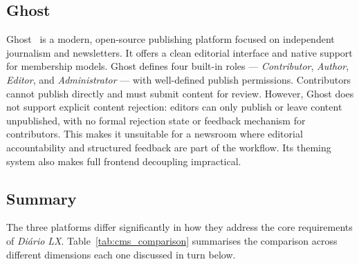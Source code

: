 \subsection{Ghost} \label{sec:background_ghost}

Ghost~\cite{ghost_cms} is a modern, open-source publishing platform focused on independent journalism
and newsletters. It offers a clean editorial interface and native support for
membership models. Ghost defines four built-in roles --- \textit{Contributor},
\textit{Author}, \textit{Editor}, and \textit{Administrator} --- with well-defined
publish permissions. Contributors cannot publish directly and must submit content for
review. However, Ghost does not support explicit content rejection: editors can only
publish or leave content unpublished, with no formal rejection state or feedback
mechanism for contributors. This makes it unsuitable for a newsroom where editorial
accountability and structured feedback are part of the workflow. Its theming system
also makes full frontend decoupling impractical.

\subsection{Summary} \label{sec:background_summary}

The three platforms differ significantly in how they address the core requirements
of \textit{Diário LX}. Table~\ref{tab:cms_comparison} summarises the comparison across different
dimensions each one discussed in turn below.

